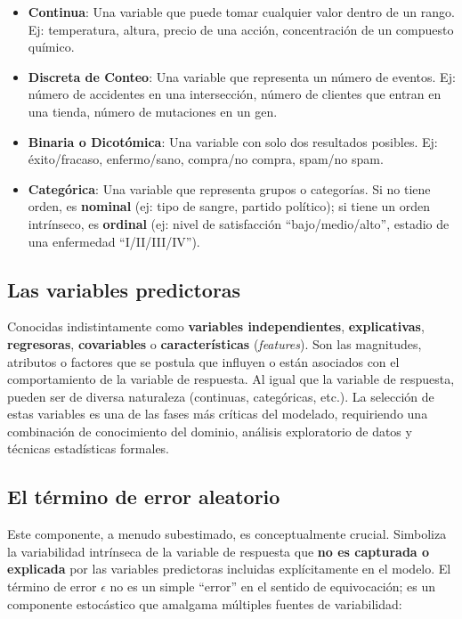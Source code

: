 \documentclass[
  letterpaper,
  DIV=11,
  numbers=noendperiod]{scrreprt}
\providecommand{\tightlist}{%
  \setlength{\itemsep}{0pt}\setlength{\parskip}{0pt}}
\begin{document}
\begin{itemize}
\tightlist
\item
  \textbf{Continua}: Una variable que puede tomar cualquier valor dentro
  de un rango. Ej: temperatura, altura, precio de una acción,
  concentración de un compuesto químico.
\item
  \textbf{Discreta de Conteo}: Una variable que representa un número de
  eventos. Ej: número de accidentes en una intersección, número de
  clientes que entran en una tienda, número de mutaciones en un gen.
\item
  \textbf{Binaria o Dicotómica}: Una variable con solo dos resultados
  posibles. Ej: éxito/fracaso, enfermo/sano, compra/no compra, spam/no
  spam.
\item
  \textbf{Categórica}: Una variable que representa grupos o categorías.
  Si no tiene orden, es \textbf{nominal} (ej: tipo de sangre, partido
  político); si tiene un orden intrínseco, es \textbf{ordinal} (ej:
  nivel de satisfacción ``bajo/medio/alto'', estadio de una enfermedad
  ``I/II/III/IV'').
\end{itemize}

\subsection{Las variables predictoras}\label{las-variables-predictoras}

Conocidas indistintamente como \textbf{variables independientes},
\textbf{explicativas}, \textbf{regresoras}, \textbf{covariables} o
\textbf{características} (\emph{features}). Son las magnitudes,
atributos o factores que se postula que influyen o están asociados con
el comportamiento de la variable de respuesta. Al igual que la variable
de respuesta, pueden ser de diversa naturaleza (continuas, categóricas,
etc.). La selección de estas variables es una de las fases más críticas
del modelado, requiriendo una combinación de conocimiento del dominio,
análisis exploratorio de datos y técnicas estadísticas formales.

\subsection{El término de error
aleatorio}\label{el-tuxe9rmino-de-error-aleatorio}

Este componente, a menudo subestimado, es conceptualmente crucial.
Simboliza la variabilidad intrínseca de la variable de respuesta que
\textbf{no es capturada o explicada} por las variables predictoras
incluidas explícitamente en el modelo. El término de error \(\epsilon\)
no es un simple ``error'' en el sentido de equivocación; es un
componente estocástico que amalgama múltiples fuentes de variabilidad:
\end{document}
